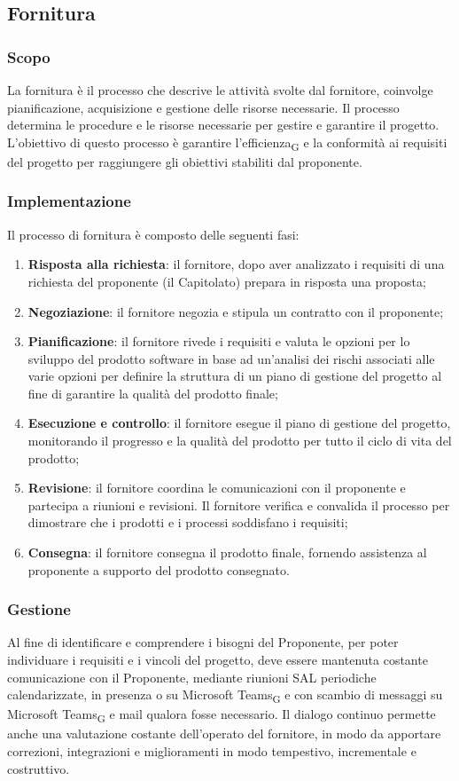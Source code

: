 \subsection{Fornitura}
\subsubsection{Scopo}
La fornitura è il processo che descrive le attività svolte dal fornitore, coinvolge pianificazione, acquisizione e gestione delle risorse necessarie. Il processo determina le procedure e le risorse necessarie per gestire e garantire il progetto. L'obiettivo di questo processo è garantire l'efficienza\textsubscript{G} e la conformità ai requisiti del progetto per raggiungere gli obiettivi stabiliti dal proponente. 
\subsubsection{Implementazione}
Il processo di fornitura è composto delle seguenti fasi:
\begin{enumerate}
    \item \textbf{Risposta alla richiesta}: il fornitore, dopo aver analizzato i requisiti di una richiesta del proponente (il Capitolato) prepara in risposta una proposta;
    \item \textbf{Negoziazione}: il fornitore negozia e stipula un contratto con il proponente;
    \item \textbf{Pianificazione}: il fornitore rivede i requisiti e valuta le opzioni per lo sviluppo del prodotto software in base ad un'analisi dei rischi associati alle varie opzioni per definire la struttura di un piano di gestione del progetto al fine di garantire la qualità del prodotto finale;
    \item \textbf{Esecuzione e controllo}: il fornitore esegue il piano di gestione del progetto, monitorando il progresso e la qualità del prodotto per tutto il ciclo di vita del prodotto;
    \item \textbf{Revisione}: il fornitore coordina le comunicazioni con il proponente e partecipa a riunioni e revisioni. Il fornitore verifica e convalida il processo per dimostrare che i prodotti e i processi soddisfano i requisiti;
    \item \textbf{Consegna}: il fornitore consegna il prodotto finale, fornendo assistenza al proponente a supporto del prodotto consegnato.
\end{enumerate}

\subsubsection{Gestione}
Al fine di identificare e comprendere i bisogni del Proponente, per poter individuare i requisiti e i vincoli del progetto, deve essere mantenuta costante comunicazione con il Proponente, mediante riunioni SAL periodiche calendarizzate, in presenza o su Microsoft Teams\textsubscript{G} e con scambio di messaggi su Microsoft Teams\textsubscript{G} e mail qualora fosse necessario. Il dialogo continuo permette anche una valutazione costante dell'operato del fornitore, in modo da apportare correzioni, integrazioni e miglioramenti in modo tempestivo, incrementale e costruttivo.

